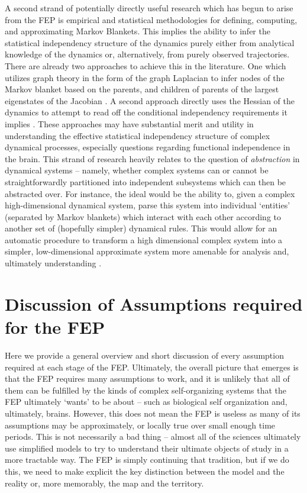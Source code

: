 A second strand of potentially directly useful research which has begun to arise from the FEP is empirical and statistical methodologies for defining, computing, and approximating Markov Blankets. This implies the ability to infer the statistical independency structure of the dynamics purely either from analytical knowledge of the dynamics or, alternatively, from purely observed trajectories. There are already two approaches to achieve this in the literature. One which utilizes graph theory in the form of the graph Laplacian to infer nodes of the Markov blanket based on the parents, and children of parents of the largest eigenstates of the Jacobian \citep{palacios2017biological,friston2013life, friston2020parcels}. A second approach directly uses the Hessian of the dynamics to attempt to read off the conditional independency requirements it implies \citep{friston2020parcels}. These approaches may have substantial merit and utility in understanding the effective statistical independency structure of complex dynamical processes, especially questions regarding functional independence in the brain. This strand of research heavily relates to the question of \emph{abstraction} in dynamical systems -- namely, whether complex systems can or cannot be straightforwardly partitioned into independent subsystems which can then be abstracted over. For instance, the ideal would be the ability to, given a complex high-dimensional dynamical system, parse this system into individual `entities' (separated by Markov blankets) which interact with each other according to another set of (hopefully simpler) dynamical rules. This would allow for an automatic procedure to transform a high dimensional complex system into a simpler, low-dimensional approximate system more amenable for analysis and, ultimately understanding \citep{friston2013life,parr2020modules,friston2007parcels}.

\section{Discussion of Assumptions required for the FEP}
Here we provide a general overview and short discussion of every assumption required at each stage of the FEP. Ultimately, the overall picture that emerges is that the FEP requires many assumptions to work, and it is unlikely that all of them can be fulfilled by the kinds of complex self-organizing systems that the FEP ultimately `wants' to be about -- such as biological self organization and, ultimately, brains. However, this does not mean the FEP is useless as many of its assumptions may be approximately, or locally true over small enough time periods. This is not necessarily a bad thing -- almost all of the sciences ultimately use simplified models to try to understand their ultimate objects of study in a more tractable way. The FEP is simply continuing that tradition, but if we do this, we need to make explicit the key distinction between the model and the reality or, more memorably, the map and the territory.

